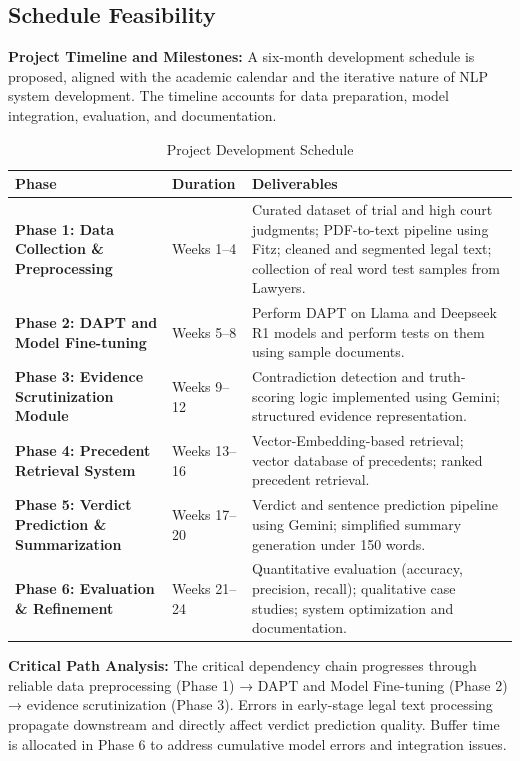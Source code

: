 \newpage
\subsection{Schedule Feasibility}
\textbf{Project Timeline and Milestones:}
A six-month development schedule is proposed, aligned with the academic calendar and the iterative nature of NLP system development. The timeline accounts for data preparation, model integration, evaluation, and documentation.

\begin{table}[h]
	\caption{Project Development Schedule}
	\label{tab:schedule}
	\centering
	\small
	\begin{tabular}{|l|l|p{6cm}|}
		\hline
		\textbf{Phase} & \textbf{Duration} & \textbf{Deliverables} \\ \hline
		\textbf{Phase 1: Data Collection \& Preprocessing} & Weeks 1--4 & Curated dataset of trial and high court judgments; PDF-to-text pipeline using Fitz; cleaned and segmented legal text; collection of real word test samples from Lawyers. \\ \hline
		\textbf{Phase 2: DAPT and Model Fine-tuning} & Weeks 5--8 & 
		Perform DAPT on Llama and Deepseek R1 models and perform tests on them using sample documents. \\ \hline
		\textbf{Phase 3: Evidence Scrutinization Module} & Weeks 9--12 & Contradiction detection and truth-scoring logic implemented using Gemini; structured evidence representation. \\ \hline
		\textbf{Phase 4: Precedent Retrieval System} & Weeks 13--16 & Vector-Embedding-based retrieval; vector database of precedents; ranked precedent retrieval. \\ \hline
		\textbf{Phase 5: Verdict Prediction \& Summarization} & Weeks 17--20 & Verdict and sentence prediction pipeline using Gemini; simplified summary generation under 150 words. \\ \hline
		\textbf{Phase 6: Evaluation \& Refinement} & Weeks 21--24 & Quantitative evaluation (accuracy, precision, recall); qualitative case studies; system optimization and documentation. \\ \hline
	\end{tabular}
\end{table}

\textbf{Critical Path Analysis:}
The critical dependency chain progresses through reliable data preprocessing (Phase 1) → DAPT and Model Fine-tuning (Phase 2) → evidence scrutinization (Phase 3). Errors in early-stage legal text processing propagate downstream and directly affect verdict prediction quality. Buffer time is allocated in Phase 6 to address cumulative model errors and integration issues.


